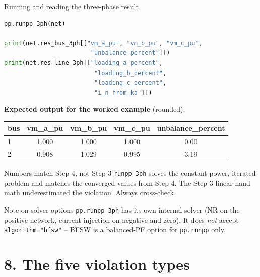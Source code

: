 \documentclass[aspectratio=169,10pt]{beamer}
\newcommand{\code}[1]{\texttt{#1}}
\begin{document}
\begin{frame}[fragile,shrink=10]{Running and reading the three-phase result}
\begin{lstlisting}[language=Python]
pp.runpp_3ph(net)

print(net.res_bus_3ph[["vm_a_pu", "vm_b_pu", "vm_c_pu",
                        "unbalance_percent"]])
print(net.res_line_3ph[["loading_a_percent",
                         "loading_b_percent",
                         "loading_c_percent",
                         "i_n_from_ka"]])
\end{lstlisting}
\textbf{Expected output for the worked example} (rounded):
\vspace{0.2em}
\centering
\small
\begin{tabular}{lcccc}
\toprule
bus & vm\_a\_pu & vm\_b\_pu & vm\_c\_pu & unbalance\_percent \\
\midrule
1 & 1.000 & 1.000 & 1.000 & 0.00 \\
2 & 0.908 & 1.029 & 0.995 & 3.19 \\
\bottomrule
\end{tabular}
\vspace{0.5em}
\begin{block}{Numbers match Step 4, not Step 3}
\code{runpp\_3ph} solves the constant-power, iterated problem and matches the converged values from Step 4. The Step-3 linear hand math underestimated the violation. Always cross-check.
\end{block}
\begin{alertblock}{Note on solver options}
\code{pp.runpp\_3ph} has its own internal solver (NR on the positive network, current injection on negative and zero). It does \emph{not} accept \code{algorithm="bfsw"} -- BFSW is a balanced-PF option for \code{pp.runpp} only.
\end{alertblock}
\end{frame}

\section*{8. The five violation types}
\end{document}
